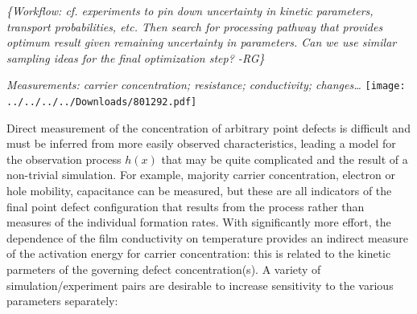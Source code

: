 \documentclass[11pt]{article}
\newcommand{\remrg}[1]{ {\it \color{drkgrn} \{#1 -RG\}}}
\begin{document}
\remrg{Workflow: cf. experiments to pin down uncertainty in kinetic
parameters, transport probabilities, etc. Then search for processing
pathway that provides optimum result given remaining uncertainty in
parameters. Can we use similar sampling ideas for the final
  optimization step?}

\emph{Measurements: carrier concentration; resistance; conductivity;
  changes\ldots}
\texttt{[image: ../../../../Downloads/801292.pdf]}


%


Direct measurement of the concentration of arbitrary point defects is
difficult and must be inferred from more easily observed
characteristics, leading a model for the observation process $h(x)$
that may be quite complicated and the result of a non-trivial
simulation.  For example, majority carrier concentration, electron or
hole mobility, capacitance can be measured, but these are all
indicators of the final point defect configuration that results from
the process rather than measures of the individual formation
rates. With significantly more effort, the dependence of the film
conductivity on temperature provides an indirect measure of the
activation energy for carrier concentration: this is related to the
kinetic parmeters of the governing defect concentration(s).  A variety
of simulation/experiment pairs are desirable to increase sensitivity
to the various parameters separately:
\end{document}
